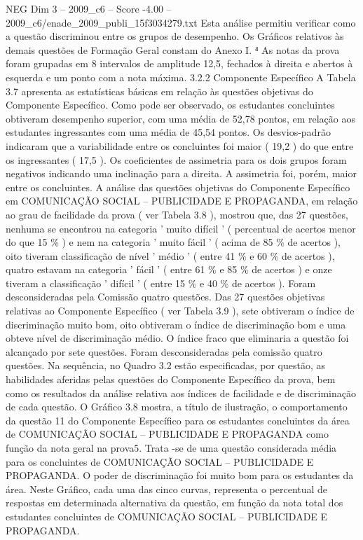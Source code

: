 \begin{textsample}{NEG Dim 3 – 2009\_c6 – Score -4.00 – 2009\_c6/enade\_2009\_publi\_15f3034279.txt}
Esta análise permitiu verificar como a questão discriminou entre os grupos de desempenho.
Os Gráficos relativos às demais questões de Formação Geral constam do Anexo I. ⁴ As notas da prova foram grupadas em 8 intervalos de amplitude 12,5, fechados à direita e abertos à esquerda e um ponto com a nota máxima. 3.2.2 Componente Específico A Tabela 3.7 apresenta as estatísticas básicas em relação às questões objetivas do Componente Específico.
Como pode ser observado, os estudantes concluintes obtiveram desempenho superior, com uma média de 52,78 pontos, em relação aos estudantes ingressantes com uma média de 45,54 pontos.
Os desvios-padrão indicaram que a variabilidade entre os concluintes foi maior ( 19,2 ) do que entre os ingressantes ( 17,5 ).
Os coeficientes de assimetria para os dois grupos foram negativos indicando uma inclinação para a direita.
A assimetria foi, porém, maior entre os concluintes.
A análise das questões objetivas do Componente Específico em COMUNICAÇÃO SOCIAL – PUBLICIDADE E PROPAGANDA, em relação ao grau de facilidade da prova ( ver Tabela 3.8 ), mostrou que, das 27 questões, nenhuma se encontrou na categoria ' muito difícil ' ( percentual de acertos menor do que 15 \% ) e nem na categoria ' muito fácil ' ( acima de 85 \% de acertos ), oito tiveram classificação de nível ' médio ' ( entre 41 \% e 60 \% de acertos ), quatro estavam na categoria ' fácil ' ( entre 61 \% e 85 \% de acertos ) e onze tiveram a classificação ' difícil ' ( entre 15 \% e 40 \% de acertos ).
Foram desconsideradas pela Comissão quatro questões.
Das 27 questões objetivas relativas ao Componente Específico ( ver Tabela 3.9 ), sete obtiveram o índice de discriminação muito bom, oito obtiveram o índice de discriminação bom e uma obteve nível de discriminação médio.
O índice fraco que eliminaria a questão foi alcançado por sete questões.
Foram desconsideradas pela comissão quatro questões.
Na sequência, no Quadro 3.2 estão especificadas, por questão, as habilidades aferidas pelas questões do Componente Específico da prova, bem como os resultados da análise relativa aos índices de facilidade e de discriminação de cada questão.
O Gráfico 3.8 mostra, a título de ilustração, o comportamento da questão 11 do Componente Específico para os estudantes concluintes da área de COMUNICAÇÃO SOCIAL – PUBLICIDADE E PROPAGANDA como função da nota geral na prova5.
Trata -se de uma questão considerada média para os concluintes de COMUNICAÇÃO SOCIAL – PUBLICIDADE E PROPAGANDA.
O poder de discriminação foi muito bom para os estudantes da área.
Neste Gráfico, cada uma das cinco curvas, representa o percentual de respostas em determinada alternativa da questão, em função da nota total dos estudantes concluintes de COMUNICAÇÃO SOCIAL – PUBLICIDADE E PROPAGANDA.

\end{textsample}
